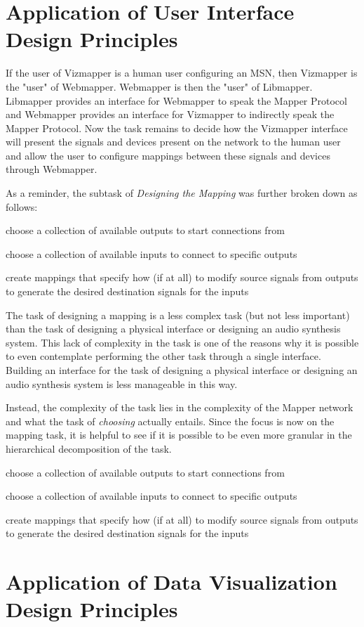\section{Application of User Interface Design Principles}

If the user of Vizmapper is a human user configuring an MSN, then Vizmapper is the "user" of Webmapper. Webmapper is then the "user" of Libmapper. Libmapper provides an interface for Webmapper to speak the Mapper Protocol and Webmapper provides an interface for Vizmapper to indirectly speak the Mapper Protocol. Now the task remains to decide how the Vizmapper interface will present the signals and devices present on the network to the human user and allow the user to configure mappings between these signals and devices through Webmapper.

As a reminder, the subtask of \emph{Designing the Mapping} was further broken down as follows:

\begin{description}
	\item choose a collection of available outputs to start connections from
	\item choose a collection of available inputs to connect to specific outputs
	\item create mappings that specify how (if at all) to modify source signals from outputs to generate the desired destination signals for the inputs
\end{description}

The task of designing a mapping is a less complex task (but not less important) than the task of designing a physical interface or designing an audio synthesis system. This lack of complexity in the task is one of the reasons why it is possible to even contemplate performing the other task through a single interface. Building an interface for the task of designing a physical interface or designing an audio synthesis system is less manageable in this way.

Instead, the complexity of the task lies in the complexity of the Mapper network and what the task of \emph{choosing} actually entails. Since the focus is now on the mapping task, it is helpful to see if it is possible to be even more granular in the hierarchical decomposition of the task. 

\begin{description}
	\item choose a collection of available outputs to start connections from
	\item choose a collection of available inputs to connect to specific outputs
	\item create mappings that specify how (if at all) to modify source signals from outputs to generate the desired destination signals for the inputs
\end{description}

\section{Application of Data Visualization Design Principles}
